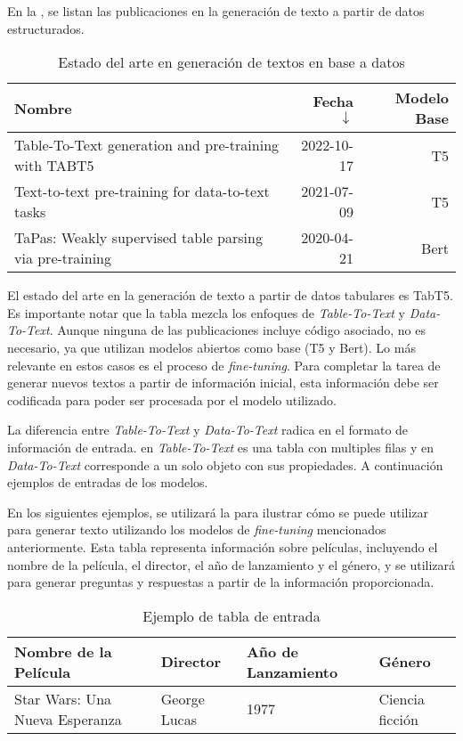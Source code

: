 En la , se listan las publicaciones en la generación de texto a partir de datos estructurados.

\begin{table}[H]
	\centering
	\caption{Estado del arte en generación de textos en base a datos}
	\label{tab-sota-text}
    \begin{tabular}{|m{20em}|r|r|}
        \hline
        \rowcolor[gray]{0.8}
        Nombre & Fecha $\downarrow$ & Modelo Base \\
        \hline
        Table-To-Text generation and pre-training with TABT5 \cite{andrejczuk_table--text_2022}
        & 2022-10-17
        & T5 \\
        \hline
        Text-to-text pre-training for data-to-text tasks \cite{kale_text--text_2020}
        & 2021-07-09
        & T5 \\
        \hline
        TaPas: Weakly supervised table parsing via pre-training \cite{herzig_tapas_2020}
        & 2020-04-21
        & Bert \\
        \hline
    \end{tabular}
\end{table}

El estado del arte en la generación de texto a partir de datos tabulares es TabT5. Es importante notar que la tabla mezcla los enfoques de \emph{Table-To-Text} y \emph{Data-To-Text}. Aunque ninguna de las publicaciones incluye código asociado, no es necesario, ya que utilizan modelos abiertos como base (T5 y Bert). Lo más relevante en estos casos es el proceso de \emph{fine-tuning}. Para completar la tarea de generar nuevos textos a partir de información inicial, esta información debe ser codificada para poder ser procesada por el modelo utilizado.

La diferencia entre \emph{Table-To-Text} y \emph{Data-To-Text} radica en el formato de información de entrada. en \emph{Table-To-Text} es una tabla con multiples filas y en \emph{Data-To-Text} corresponde a un solo objeto con sus propiedades. A continuación ejemplos de entradas de los modelos.

\newpage
En los siguientes ejemplos, se utilizará la  para ilustrar cómo se puede utilizar para generar texto utilizando los modelos de \emph{fine-tuning} mencionados anteriormente. Esta tabla representa información sobre películas, incluyendo el nombre de la película, el director, el año de lanzamiento y el género, y se utilizará para generar preguntas y respuestas a partir de la información proporcionada.
\begin{table}[H]
	\centering
	\caption{Ejemplo de tabla de entrada}
	\label{tabla-ejemplo-inputs}
    \begin{tabular}{|l|l|l|l|}
        \hline
        \rowcolor[gray]{0.8}
        Nombre de la Película & Director & Año de Lanzamiento & Género \\
        \hline
        Star Wars: Una Nueva Esperanza & George Lucas & 1977 & Ciencia ficción \\
        \hline
    \end{tabular}
        
\end{table}


